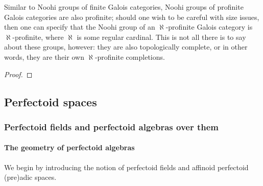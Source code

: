                 \begin{lemma} \label{lemma: profiniteness_of_noohi_groups_reprised}
                    Similar to Noohi groups of finite Galois categories, Noohi groups of profinite Galois categories are also profinite; should one wish to be careful with size issues, then one can specify that the Noohi group of an $\aleph$-profinite Galois category is $\aleph$-profinite, where $\aleph$ is some regular cardinal. This is not all there is to say about these groups, however: they are also topologically complete, or in other words, they are their own $\aleph$-profinite completions.
                \end{lemma}
                    \begin{proof}
                        
                    \end{proof}
                    
                \begin{proposition} \label{prop: pro_etale_galois_groups}
                    
                \end{proposition}
    
        \subsection{Perfectoid spaces}
            \subsubsection{Perfectoid fields and perfectoid algebras over them}
                \paragraph{The geometry of perfectoid algebras}
                    We begin by introducing the notion of perfectoid fields and affinoid perfectoid (pre)adic spaces.
                
